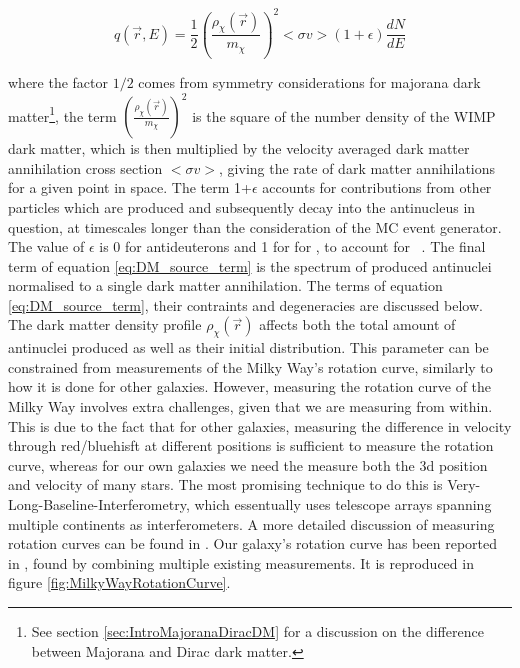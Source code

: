 \begin{equation}\label{eq:DM_source_term}
    q(\vec{r}, E) = \frac{1}{2} \left( \frac{\rho_{\chi}(\vec{r})}{m_\chi}\right)^2 <\sigma v > (1+\epsilon) \frac{dN}{dE}
\end{equation}

where the factor $1/2$ comes from symmetry considerations for majorana dark matter\footnote{See section \ref{sec:IntroMajoranaDiracDM} for a discussion on the difference between Majorana and Dirac dark matter.}, the term $\left( \frac{\rho_{\chi}(\vec{r})}{m_\chi}\right)^2$ is the square of the number density of the WIMP dark matter, which is then multiplied by the velocity averaged dark matter annihilation cross section $<\sigma v>$, giving the rate of dark matter annihilations for a given point in space. The term 1+$\epsilon$ accounts for contributions from other particles which are produced and subsequently decay into the antinucleus in question, at timescales longer than the consideration of the MC event generator. The value of $\epsilon$ is 0 for antideuterons and 1 for for \ahe, to account for \atrit\ . The final term of equation \ref{eq:DM_source_term} is the spectrum of produced antinuclei normalised to a single dark matter annihilation. The terms of equation \ref{eq:DM_source_term}, their contraints and degeneracies are discussed below.\\

The dark matter density profile $\rho_\chi(\vec{r})$ affects both the total amount of antinuclei produced as well as their initial distribution. This parameter can be constrained from measurements of the Milky Way's rotation curve, similarly to how it is done for other galaxies. However, measuring the rotation curve of the Milky Way involves extra challenges, given that we are measuring from within. This is due to the fact that for other galaxies, measuring the difference in velocity through red/bluehisft at different positions is sufficient to measure the rotation curve, whereas for our own galaxies we need the measure both the 3d position and velocity of many stars. The most promising technique to do this is Very-Long-Baseline-Interferometry, which essentually uses telescope arrays spanning multiple continents as interferometers\cite{}. A more detailed discussion of measuring rotation curves can be found in \cite{Sofue_2016, Sofue2020}. Our galaxy's rotation curve  has been reported in \cite{Sofue2020}, found by combining multiple existing measurements. It is reproduced in figure \ref{fig:MilkyWayRotationCurve}. \\

